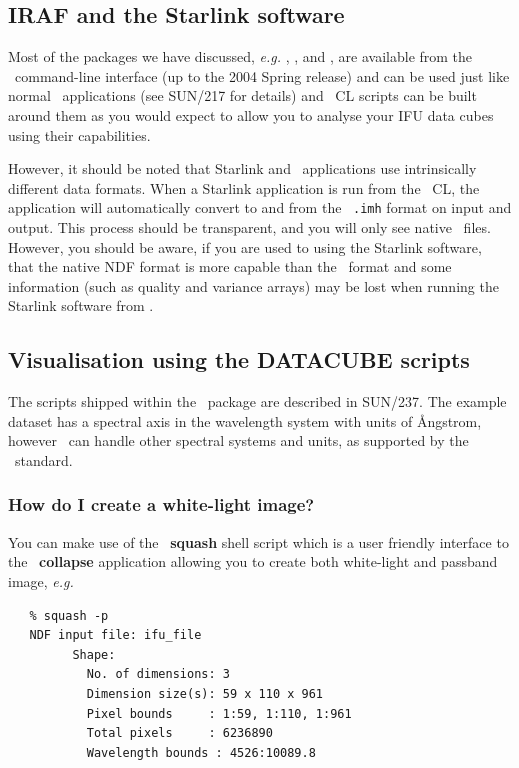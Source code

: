\documentclass[twoside,11pt]{article}
\newcommand{\xref}[3]{#1}
\newcommand{\xlabel}[1]{}
\begin{document}
{\subsection{\xlabel{sc16_irafstar}IRAF and the Starlink software\label{sc16_irafstar}}

Most of the packages we have discussed, \emph{e.g.} \KAPPAref,
\FIGAROref, and \CCDPACKref, are available from the \IRAFref\ command-line
interface (up to the 2004 Spring release) and can be used just like
normal \IRAF\ applications (see \xref{SUN/217}{sun217}{} for details)
and \IRAF\ CL scripts can be built around them as you would expect to
allow you to analyse your IFU data cubes using their capabilities.

However, it should be noted that Starlink and \IRAF\ applications use
intrinsically different data formats.  When a Starlink application is
run from the \IRAF\ CL, the application will automatically convert to
and from the \IRAF\ {\tt .imh} format on input and output.  This process
should be transparent, and you will only see native \IRAF\ files.
However, you should be aware, if you are used to using the Starlink
software, that the native \xref{NDF}{sun33}{} format is more capable
than the \IRAF\ format and some information (such as quality and
variance arrays) may be lost when running the Starlink software from
\IRAF.

\subsection{\xlabel{sc16_vis}Visualisation using the DATACUBE scripts\label{sc16_vis}}

The scripts shipped within the \DATACUBE\ package are described in 
\xref{SUN/237}{sun237}{}.  The example dataset has a spectral axis in
the wavelength system with units of {\AA}ngstrom, however \DATACUBE\ can
handle other spectral systems and units, as supported by the \FITSref\
standard.

\subsubsection{How do I create a white-light image?}

You can make use of the \DATACUBE\ \xref{{\bf squash}}{sun237}{squash}
shell script which is a user friendly interface to the \KAPPA\
\xref{{\bf collapse}}{sun95}{COLLAPSE} application allowing you to create
both white-light and passband image, \emph{e.g.}\

\small\begin{verbatim}
   % squash -p
   NDF input file: ifu_file
         Shape:
           No. of dimensions: 3
           Dimension size(s): 59 x 110 x 961
           Pixel bounds     : 1:59, 1:110, 1:961
           Total pixels     : 6236890
           Wavelength bounds : 4526:10089.8


\end{verbatim}}
\end{document}
